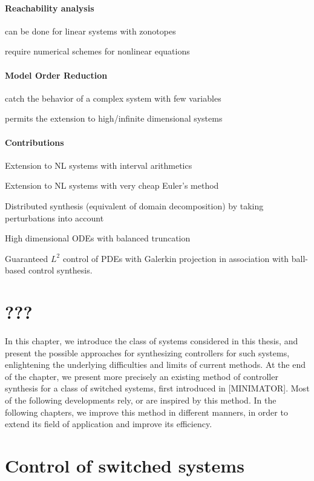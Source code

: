 \paragraph{Reachability analysis}

can be done for linear systems with zonotopes

require numerical schemes for nonlinear equations

\paragraph{Model Order Reduction}

catch the behavior of a complex system with few variables

permits the extension to high/infinite dimensional systems

\paragraph{Contributions}

Extension to NL systems with interval arithmetics

Extension to NL systems with very cheap Euler's method

Distributed synthesis (equivalent of domain decomposition)
by taking perturbations into account

High dimensional ODEs with balanced truncation

Guaranteed $L^2$ control of 
PDEs with Galerkin projection in association with ball-based control synthesis.


\section{???}

In this chapter, we introduce the class of systems considered in this thesis, and present 
the possible approaches for synthesizing controllers for such systems, enlightening
the underlying difficulties and limits of current methods. At the end of the chapter, 
we present more precisely an existing method of controller synthesis for a class of
switched systems, first introduced in \cite{???} [MINIMATOR]. Most of 
the following developments rely, or are inspired by this method.  
In the following chapters, we improve this method in different manners, in order to extend its field of 
application and improve its efficiency.


\section{Control of switched systems}


